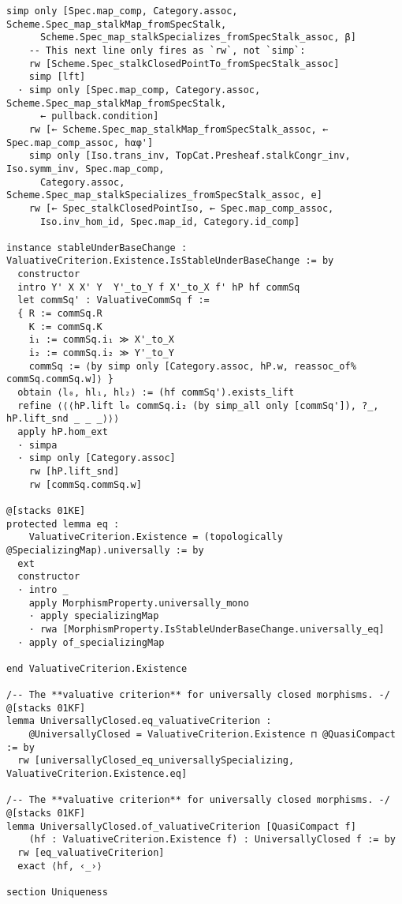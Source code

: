 \documentclass{article}
\begin{document}
\begin{lstlisting}[language=Lean, caption={ValuativeCriterion.lean}]
    simp only [Spec.map_comp, Category.assoc, Scheme.Spec_map_stalkMap_fromSpecStalk,
      Scheme.Spec_map_stalkSpecializes_fromSpecStalk_assoc, β]
    -- This next line only fires as `rw`, not `simp`:
    rw [Scheme.Spec_stalkClosedPointTo_fromSpecStalk_assoc]
    simp [lft]
  · simp only [Spec.map_comp, Category.assoc, Scheme.Spec_map_stalkMap_fromSpecStalk,
      ← pullback.condition]
    rw [← Scheme.Spec_map_stalkMap_fromSpecStalk_assoc, ← Spec.map_comp_assoc, hαφ']
    simp only [Iso.trans_inv, TopCat.Presheaf.stalkCongr_inv, Iso.symm_inv, Spec.map_comp,
      Category.assoc, Scheme.Spec_map_stalkSpecializes_fromSpecStalk_assoc, e]
    rw [← Spec_stalkClosedPointIso, ← Spec.map_comp_assoc,
      Iso.inv_hom_id, Spec.map_id, Category.id_comp]

instance stableUnderBaseChange : ValuativeCriterion.Existence.IsStableUnderBaseChange := by
  constructor
  intro Y' X X' Y  Y'_to_Y f X'_to_X f' hP hf commSq
  let commSq' : ValuativeCommSq f :=
  { R := commSq.R
    K := commSq.K
    i₁ := commSq.i₁ ≫ X'_to_X
    i₂ := commSq.i₂ ≫ Y'_to_Y
    commSq := ⟨by simp only [Category.assoc, hP.w, reassoc_of% commSq.commSq.w]⟩ }
  obtain ⟨l₀, hl₁, hl₂⟩ := (hf commSq').exists_lift
  refine ⟨⟨⟨hP.lift l₀ commSq.i₂ (by simp_all only [commSq']), ?_, hP.lift_snd _ _ _⟩⟩⟩
  apply hP.hom_ext
  · simpa
  · simp only [Category.assoc]
    rw [hP.lift_snd]
    rw [commSq.commSq.w]

@[stacks 01KE]
protected lemma eq :
    ValuativeCriterion.Existence = (topologically @SpecializingMap).universally := by
  ext
  constructor
  · intro _
    apply MorphismProperty.universally_mono
    · apply specializingMap
    · rwa [MorphismProperty.IsStableUnderBaseChange.universally_eq]
  · apply of_specializingMap

end ValuativeCriterion.Existence

/-- The **valuative criterion** for universally closed morphisms. -/
@[stacks 01KF]
lemma UniversallyClosed.eq_valuativeCriterion :
    @UniversallyClosed = ValuativeCriterion.Existence ⊓ @QuasiCompact := by
  rw [universallyClosed_eq_universallySpecializing, ValuativeCriterion.Existence.eq]

/-- The **valuative criterion** for universally closed morphisms. -/
@[stacks 01KF]
lemma UniversallyClosed.of_valuativeCriterion [QuasiCompact f]
    (hf : ValuativeCriterion.Existence f) : UniversallyClosed f := by
  rw [eq_valuativeCriterion]
  exact ⟨hf, ‹_›⟩

section Uniqueness


\end{lstlisting}
\end{document}
